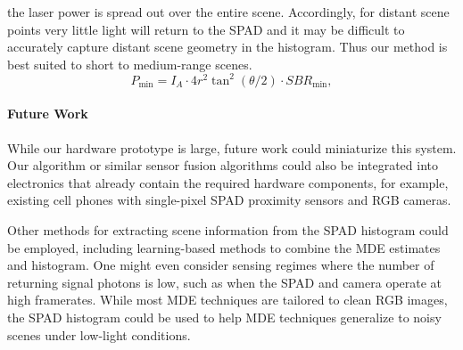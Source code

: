 the laser
power is spread out over the entire scene. Accordingly, for distant scene points very
little light will return to the SPAD and it may be difficult to accurately
capture distant scene geometry in the histogram. Thus our method is best suited
to short to medium-range scenes. 
%
\begin{equation}
  P_{\text{min}} = I_A \cdot 4 r^2 \tan^2(\theta/2) \cdot SBR_{\text{min}},
\end{equation} 


\paragraph{Future Work}
While our hardware prototype is large, future work could miniaturize this
system. Our algorithm or similar sensor fusion algorithms could
also be integrated into electronics that already contain the required hardware
components, for example, existing cell phones with single-pixel SPAD
proximity sensors and RGB cameras.

Other methods for extracting scene information from the SPAD histogram could be
employed, including learning-based methods to combine the MDE estimates and
histogram. One might even consider sensing regimes where the number of
returning signal photons is low, such as when the SPAD and camera operate
at high framerates. While most MDE techniques are tailored to clean RGB images,  
the SPAD histogram could be used to help MDE
techniques generalize to noisy scenes under low-light conditions. 
 



